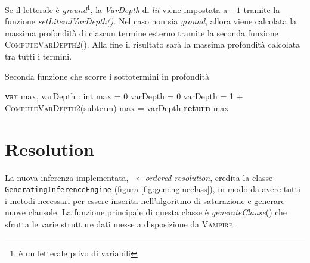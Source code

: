 Se il letterale è \emph{ground}\footnote{è un letterale privo di variabili}, la \emph{VarDepth} di \emph{lit} viene impostata a $-1$ tramite la funzione 
\emph{setLiteralVarDepth()}.
Nel caso non sia \emph{ground}, allora viene calcolata la massima profondità di ciascun termine esterno tramite la seconda funzione \textsc{ComputeVarDepth2}().
Alla fine il risultato sarà la massima profondità calcolata tra tutti i termini. 
\begin{algorithm}[H]
    \caption{Seconda funzione che scorre i sottotermini in profondità}
    \begin{algorithmic}
        \State \textbf{var} max, varDepth : int
        \State max = 0
         
            \State varDepth = 0
            \State varDepth = 1 + \textsc{ComputeVarDepth2}(subterm) 
                \State max = varDepth
            \EndIf
        \EndFor
        \State \underline{\textbf{return} max}
        \EndFunction
    \end{algorithmic}
\end{algorithm}
\section{Resolution}
La nuova inferenza implementata, $\prec$-\emph{ordered resolution}, eredita la classe \\\verb|GeneratingInferenceEngine| (figura \ref{fig:genengineclass}), 
 in modo da avere tutti i metodi necessari per essere inserita 
nell'algoritmo di saturazione e generare nuove clausole.
La funzione principale di questa classe è \emph{generateClause}() che sfrutta le varie strutture 
dati messe a disposizione da \textsc{Vampire}. 

